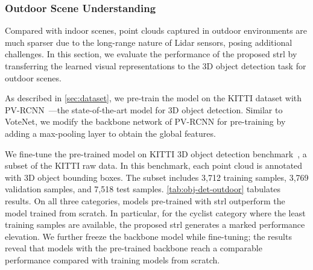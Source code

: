 \documentclass[10pt,twocolumn,letterpaper]{article}
\begin{document}
\subsubsection{Outdoor Scene Understanding}

Compared with indoor scenes, point clouds captured in outdoor environments are much sparser due to the long-range nature of Lidar sensors, posing additional challenges. In this section, we evaluate the performance of the proposed \ac{strl} by transferring the learned visual representations to the 3D object detection task for outdoor scenes.

As described in \cref{sec:dataset}, we pre-train the model on the KITTI dataset with PV-RCNN~\cite{shi2020pv}---the state-of-the-art model for 3D object detection. Similar to VoteNet, we modify the backbone network of PV-RCNN for pre-training by adding a max-pooling layer to obtain the global features.


We fine-tune the pre-trained model on KITTI 3D object detection benchmark~\cite{geiger2012we}, a subset of the KITTI raw data. In this benchmark, each point cloud is annotated with 3D object bounding boxes. The subset includes 3,712 training samples, 3,769 validation samples, and 7,518 test samples. \cref{tab:obj-det-outdoor} tabulates results. On all three categories, models pre-trained with \ac{strl} outperform the model trained from scratch. In particular, for the cyclist category where the least training samples are available, the proposed \ac{strl} generates a marked performance elevation. We further freeze the backbone model while fine-tuning; the results reveal that models with the pre-trained backbone reach a comparable performance compared with training models from scratch.

\begin{table}[htb!]
    \centering
    \caption{\textbf{3D object detection fine-tuned on KITTI}. We report 3D detection performance with moderate difficulty on the val set of KITTI dataset. Performances below are evaluated by mAP with 40 recall positions.}
    \label{tab:obj-det-outdoor}
    \end{table}
 
\end{document}
